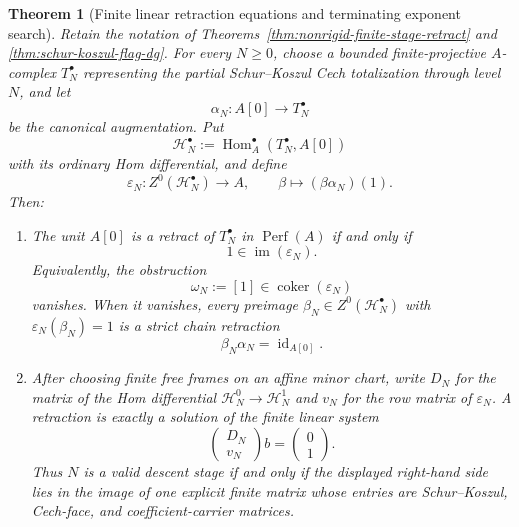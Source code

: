 \documentclass[11pt]{article}
\newtheorem{theorem}{Theorem}[section]
\theoremstyle{definition}
\begin{document}
\begin{theorem}[Finite linear retraction equations and terminating exponent search]\label{thm:linear-descent-retraction}
Retain the notation of Theorems~\ref{thm:nonrigid-finite-stage-retract} and
\ref{thm:schur-koszul-flag-dg}.  For every $N\geq0$, choose a bounded
finite-projective $A$-complex $T_N^\bullet$ representing the partial
Schur--Koszul Cech totalization through level $N$, and let
\[
 \alpha_N:A[0]\longrightarrow T_N^\bullet
\]
be the canonical augmentation.  Put
\[
 \mathcal H_N^\bullet
 :=\operatorname{Hom}_A^\bullet(T_N^\bullet,A[0])
\]
with its ordinary Hom differential, and define
\begin{equation}\label{eq:descent-retraction-evaluation}
 \varepsilon_N:Z^0(\mathcal H_N^\bullet)\longrightarrow A,
 \qquad
 \beta\longmapsto (\beta\alpha_N)(1).
\end{equation}
Then:

\begin{enumerate}[label=\textnormal{(\roman*)}]
\item The unit $A[0]$ is a retract of $T_N^\bullet$ in
$\operatorname{Perf}(A)$ if and only if
\begin{equation}\label{eq:descent-stage-obstruction}
 1\in\operatorname{im}(\varepsilon_N).
\end{equation}
Equivalently, the obstruction
\[
 \omega_N:=[1]\in\operatorname{coker}(\varepsilon_N)
\]
vanishes.  When it vanishes, every preimage
$\beta_N\in Z^0(\mathcal H_N^\bullet)$ with
$\varepsilon_N(\beta_N)=1$ is a strict chain retraction
\[
 \beta_N\alpha_N=\operatorname{id}_{A[0]}.
\]

\item After choosing finite free frames on an affine minor chart, write
$D_N$ for the matrix of the Hom differential
$\mathcal H_N^0\to\mathcal H_N^1$ and $v_N$ for the row matrix of
$\varepsilon_N$.  A retraction is exactly a solution of the finite linear
system
\begin{equation}\label{eq:finite-descent-linear-system}
 \begin{pmatrix}D_N\\ v_N\end{pmatrix}b
 =
 \begin{pmatrix}0\\1\end{pmatrix}.
\end{equation}
Thus $N$ is a valid descent stage if and only if the displayed right-hand
side lies in the image of one explicit finite matrix whose entries are
Schur--Koszul, Cech-face, and coefficient-carrier matrices.


\end{enumerate}
\end{theorem}
\end{document}
